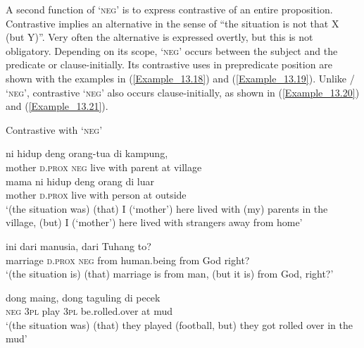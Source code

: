 A second function of  ‘\textsc{neg}’ is to express contrastive  of an entire proposition. Contrastive  implies an alternative in the sense of ``the situation is not that X (but Y)''. Very often the alternative is expressed overtly, but this is not obligatory. Depending on its scope,  ‘\textsc{neg}’ occurs between the subject and the predicate or clause-initially. Its contrastive uses in prepredicate position are shown with the examples in (\ref{Example_13.18}) and (\ref{Example_13.19}). Unlike / ‘\textsc{neg}’, contrastive  ‘\textsc{neg}’ also occurs clause-initially, as shown in (\ref{Example_13.20}) and (\ref{Example_13.21}).


\begin{styleExampleTitle}
Contrastive  with  ‘\textsc{neg}’
\end{styleExampleTitle}

\ea
\label{Example_13.18}
 {ni} {{}} {{hidup}} {{deng}} {{orang-tua}} {di} {kampung,}\\ %
 mother  \textsc{d.prox}  {\textsc{neg}}  {live}  {with}  {parent}  at  village\\
\gll mama  ni  hidup  {deng}  {orang}  {di}  {luar}\\
 mother  \textsc{d.prox}  live  {with}  {person}  {at}  {outside}\\
\glt 
‘(the situation was)  (that) I (‘mother’) here lived with (my) parents in the village, (but) I (‘mother’) here lived with strangers away from home’ \textstyleExampleSource{[081115-001b-Cv.0043]}
\z

\ea
\label{Example_13.19}
 {ini} {} {dari} {manusia,} {dari} {Tuhang} {to?}\\ %
 marriage  \textsc{d.prox}  \textsc{neg}  from  human.being  from  God  right?\\
\glt 
‘(the situation is)  (that) marriage is from man, (but it is) from God, right?’ \textstyleExampleSource{[081110-006-CvEx.0239]}
\z

\ea
\label{Example_13.20}
 {dong} {maing,} {dong} {taguling} {di} {pecek}\\ %
 \textsc{neg}  \textsc{3pl}  play  \textsc{3pl}  be.rolled.over  at  mud\\
\glt 
‘(the situation was)  (that) they played (football, but) they got rolled over in the mud’ \textstyleExampleSource{[081109-001-Cv.0025]}
\z

